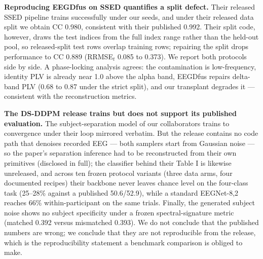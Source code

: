 \textbf{Reproducing EEGDfus on SSED quantifies a split defect.} Their released SSED pipeline trains successfully under our seeds, and under their released data split we obtain CC 0.980, consistent with their published 0.992. Their split code, however, draws the test indices from the full index range rather than the held-out pool, so released-split test rows overlap training rows; repairing the split drops performance to CC 0.889 (RRMSE$_t$ 0.085 to 0.373). We report both protocols side by side. A phase-locking analysis agrees: the contamination is low-frequency, identity PLV is already near 1.0 above the alpha band, EEGDfus repairs delta-band PLV (0.68 to 0.87 under the strict split), and our transplant degrades it --- consistent with the reconstruction metrics.

\textbf{The DS-DDPM release trains but does not support its published evaluation.} The subject-separation model of our collaborators trains to convergence under their loop mirrored verbatim. But the release contains no code path that denoises recorded EEG --- both samplers start from Gaussian noise --- so the paper's separation inference had to be reconstructed from their own primitives (disclosed in full); the classifier behind their Table I is likewise unreleased, and across ten frozen protocol variants (three data arms, four documented recipes) their backbone never leaves chance level on the four-class task (25--28\% against a published 50.6/52.9), while a standard EEGNet-8,2 reaches 66\% within-participant on the same trials. Finally, the generated subject noise shows no subject specificity under a frozen spectral-signature metric (matched 0.392 versus mismatched 0.393). We do not conclude that the published numbers are wrong; we conclude that they are not reproducible from the release, which is the reproducibility statement a benchmark comparison is obliged to make.
